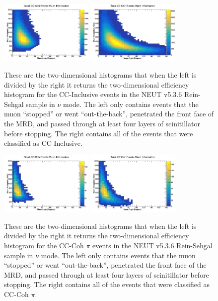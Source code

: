 \documentclass[11pt]{article}
\begin{document}
\begin{figure}[H]
\centering
\includegraphics[width=0.4\textwidth]{NewNMReinSehgalImages/6-GoodCCCohMuonInfoNMRS.png}
\includegraphics[width=0.4\textwidth]{NewNMReinSehgalImages/9-TotalCCCohMuonInfoNMRS.png}
\caption{These are the two-dimensional histograms that when the left is divided by the right it returns the two-dimensional efficiency histogram for the CC-Inclusive events in the NEUT v5.3.6 Rein-Sehgal sample in $\nu$ mode. The left only contains events that the muon ``stopped'' or went ``out-the-back'', penetrated the front face of the MRD, and passed through at least four layers of scinitillator before stopping. The right contains all of the events that were classified as CC-Inclusive.}
\label{fig:app:NMCCInclusiveMuon2DRS}
\end{figure}

\begin{figure}[H]
\centering
\includegraphics[width=0.4\textwidth]{NewNMReinSehgalImages/7.png}
\includegraphics[width=0.4\textwidth]{NewNMReinSehgalImages/8.png}
\caption{These are the two-dimensional histograms that when the left is divided by the right it returns the two-dimensional efficiency histogram for the CC-Coh $\pi$ events in the NEUT v5.3.6 Rein-Sehgal sample in $\nu$ mode. The left only contains events that the muon ``stopped'' or went ``out-the-back'', penetrated the front face of the MRD, and passed through at least four layers of scinitillator before stopping. The right contains all of the events that were classified as CC-Coh $\pi$.}
\label{fig:app:NMCCCohMuon2DRS}
\end{figure}
\end{document}
